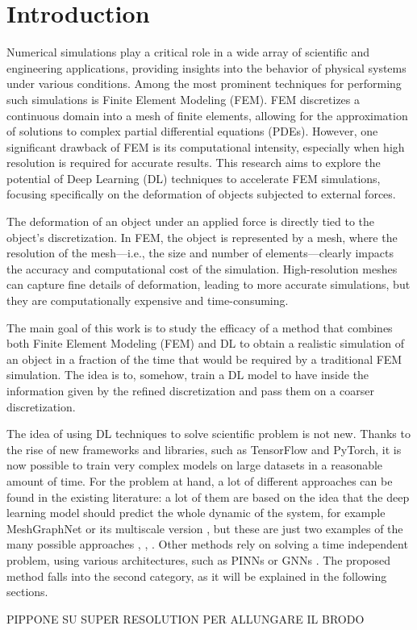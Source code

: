 \section{Introduction}

Numerical simulations play a critical role in a wide array of scientific and engineering applications, providing insights into the behavior of physical systems under various conditions. Among the most prominent techniques for performing such simulations is Finite Element Modeling (FEM). FEM discretizes a continuous domain into a mesh of finite elements, allowing for the approximation of solutions to complex partial differential equations (PDEs). However, one significant drawback of FEM is its computational intensity, especially when high resolution is required for accurate results. This research aims to explore the potential of Deep Learning (DL) techniques to accelerate FEM simulations, focusing specifically on the deformation of objects subjected to external forces.

The deformation of an object under an applied force is directly tied to the object's discretization. In FEM, the object is represented by a mesh, where the resolution of the mesh—i.e., the size and number of elements—clearly impacts the accuracy and computational cost of the simulation. High-resolution meshes can capture fine details of deformation, leading to more accurate simulations, but they are computationally expensive and time-consuming. 

The main goal of this work is to study the efficacy of a method that combines both Finite Element Modeling (FEM) and DL to obtain a realistic simulation of an object in a fraction of the time that would be required by a traditional FEM simulation. The idea is to, somehow, train a DL model to have inside the information given by the refined discretization and pass them on a coarser discretization.

The idea of using DL techniques to solve scientific problem is not new. Thanks to the rise of new frameworks and libraries, such as TensorFlow and PyTorch, it is now possible to train very complex models on large datasets in a reasonable amount of time. For the problem at hand, a lot of different approaches can be found in the existing literature: a lot of them are based on the idea that the deep learning model should predict the whole dynamic of the system, for example MeshGraphNet \citep{pfaffLearningMeshBasedSimulation2021a} or its multiscale version \citep{fortunatoMultiScaleMeshGraphNets2022}, but these are just two examples of the many possible approaches \citep{jiangMeshfreeFlowNetPhysicsConstrainedDeep2020}, \citep{djeumouNeuralNetworksPhysicsInformed2022}, \citep{hanPredictingPhysicsMeshreduced2022a}. Other methods rely on solving a time independent problem, using various architectures, such as PINNs \citep{djeumouNeuralNetworksPhysicsInformed2022} or GNNs \citep{gaoPhysicsinformedGraphNeural2022}. The proposed method falls into the second category, as it will be explained in the following sections.

PIPPONE SU SUPER RESOLUTION PER ALLUNGARE IL BRODO


